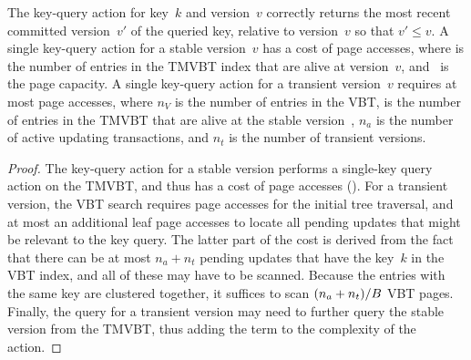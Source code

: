 \thmskip
\begin{theorem}
\label{theorem:cmvbt:key-query} 
The key-query action for key~$k$ and version~$v$ correctly returns the
most recent committed version~$v'$ of the queried key, relative to
version~$v$ so that $v' \leq v$.
A single key-query action for a stable version~$v$ has a cost of
 page accesses, where  is the
number of entries in the TMVBT index that are alive at version~$v$, and
\capacity\ is the page capacity.
A single key-query action for a transient version~$v$ requires at
most  page accesses, where $n_V$ is the number of entries in
the VBT, \entries{\stablever} is the number of entries in the TMVBT that are
alive at the stable version~\stablever, $n_a$ is the number of active
updating transactions, and $n_t$ is the number of transient versions.
\end{theorem}
\begin{proof}
The key-query action for a stable version performs a single-key query
action on the TMVBT, and thus has a cost of  page accesses (). 
For a transient version, the VBT search requires 
page accesses for the initial tree traversal, and at most an
additional  leaf page accesses to locate all
pending updates that might be relevant to the key query.
The latter part of the cost is derived from the fact that there can be at 
most $n_a + n_t$ pending updates that have the key~$k$ in the VBT index,
and all of these may have to be scanned.
Because the entries with the same key are clustered together, it
suffices to scan $(n_a + n_t) / B$ VBT pages.
Finally, the query for a transient version may need to further query the
stable version from the TMVBT, thus adding the \OhT{\log_\capacity
\entries{\stablever}} term to the complexity of the action.
\end{proof}
\thmskip

